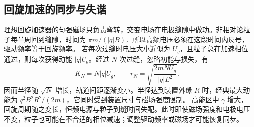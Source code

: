 \subsection{回旋加速的同步与失谐}
理想回旋加速器的匀强磁场只负责弯转，交变电场在电极缝隙中做功。非相对论粒子每半周回到缝隙，时间为 $\pi m/(|q|B)$，所以高频电压必须在这段时间内反号，驱动频率等于回旋频率。
若每次过缝时电压大小近似为 $U_g$，且粒子总在加速相位通过，则每次获得动能 $|q|U_g$。经过 $N$ 次过缝，忽略初能与损失，有
\[
 K_N=N|q|U_g,\qquad r_N=\sqrt{\frac{2mNU_g}{|q|B^2}}.
\]
因而半径随 $\sqrt N$ 增长，轨道间距逐渐变小。半径达到装置外缘 $R$ 时，经典最大动能为 $q^2B^2R^2/(2m)$，它同时受到装置尺寸与磁场强度限制。
高能区中 $\gamma$ 增大，回旋周期随之变长，恒频电源与粒子到缝时间失配。此时即使磁场强度和电极电压不变，粒子也可能在不合适的相位减速；调整驱动频率或磁场才可能恢复同步。


